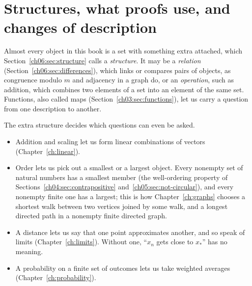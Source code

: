 \section{Structures, what proofs use, and changes of description}\label{appC:sec:structures}
Almost every object in this book is a set with something extra attached, which Section~\ref{ch06:sec:structure} calls a \emph{structure}. It may be a \emph{relation} (Section~\ref{ch06:sec:differences}), which links or compares pairs of objects, as congruence modulo $m$ and adjacency in a graph do, or an \emph{operation}, such as addition, which combines two elements of a set into an element of the same set. Functions, also called maps (Section~\ref{ch03:sec:functions}), let us carry a question from one description to another.

The extra structure decides which questions can even be asked.
\begin{itemize}
\item Addition and scaling let us form linear combinations of vectors (Chapter~\ref{ch:linear}).
\item Order lets us pick out a smallest or a largest object. Every nonempty set of natural numbers has a smallest member (the well-ordering property of Sections~\ref{ch04:sec:contrapositive} and~\ref{ch05:sec:not-circular}), and every nonempty finite one has a largest; this is how Chapter~\ref{ch:graphs} chooses a shortest walk between two vertices joined by some walk, and a longest directed path in a nonempty finite directed graph.
\item A distance lets us say that one point approximates another, and so speak of limits (Chapter~\ref{ch:limits}). Without one, ``$x_n$ gets close to $x_*$'' has no meaning.
\item A probability on a finite set of outcomes lets us take weighted averages (Chapter~\ref{ch:probability}).
\end{itemize}

